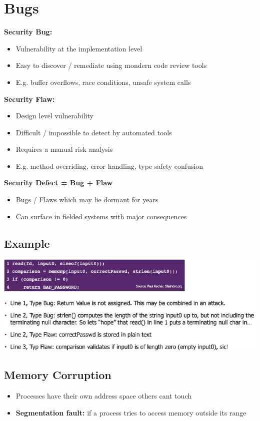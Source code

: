 
\section{Bugs}
\textbf{Security Bug:}
\begin{itemize}
    \item Vulnerability at the implementation level
    \item Easy to discover / remediate using mondern code review tools
    \item E.g. buffer overflows, race conditions, unsafe system calls
\end{itemize}
\textbf{Security Flaw:}
\begin{itemize}
    \item Design level vulnerability
    \item Difficult / impossible to detect by automated tools
    \item Requires a manual risk analysis
    \item E.g. method overriding, error handling, type safety confusion
\end{itemize}
\textbf{Security Defect = Bug + Flaw}
\begin{itemize}
    \item Bugs / Flaws which may lie dormant for years
    \item Can surface in fielded systems with major consequences
\end{itemize}

\subsection{Example}
\includegraphics[width=\linewidth]{../img/bug_example.png}

\subsection{Memory Corruption}
\begin{itemize}
    \item Processes have their own address space others cant touch
    \item \textbf{Segmentation fault:} if a process tries to access memory outside its range
\end{itemize}

